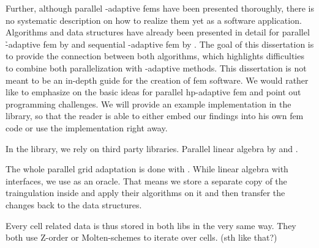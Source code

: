


Further, although parallel \hp-adaptive \glspl{fem} have been presented thoroughly, there is no systematic description on how to realize them yet as a software application.
Algorithms and data structures have already been presented in detail for parallel \h-adaptive \gls{fem} by \textcite{bangerth2012} and sequential \hp-adaptive \gls{fem} by \textcite{bangerth2009}.
The goal of this dissertation is to provide the connection between both algorithms, which highlights difficulties to combine both parallelization with \hp-adaptive methods. This dissertation is not meant to be an in-depth guide for the creation of \gls{fem} software. We would rather like to emphasize on the basic ideas for parallel hp-adaptive \gls{fem} and point out programming challenges. We will provide an example implementation in the \dealii{} library, so that the reader is able to either embed our findings into his own \gls{fem} code or use the \dealii{} implementation right away.

In the \dealii{} library, we rely on third party libraries. Parallel linear algebra by \trilinos{} \parencite{heroux2005,trilinos12181} and \petsc{} \parencite{balay2019,petsc3124}.

The whole parallel grid adaptation is done with \pforest{} \parencite{burstedde2011, p4est22}. While linear algebra with interfaces, we use \pforest{} as an oracle. That means we store a separate copy of the traingulation inside \pforest{} and apply their algorithms on it and then transfer the changes back to the \dealii{} data structures.

Every cell related data is thus stored in both libs in the very same way. They both use Z-order or Molten-schemes to iterate over cells. (sth like that?)



